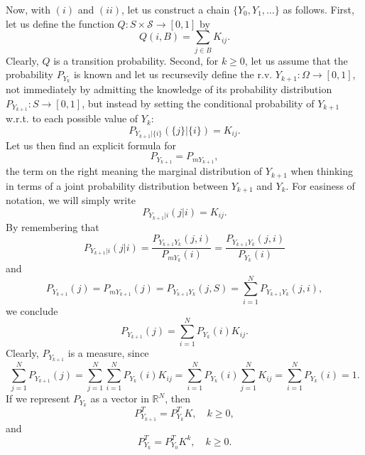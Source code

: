 Now, with $(i)$ and $(ii)$, let us construct a chain $\{Y_0,Y_1,\ldots\}$ as follows.
First, let us define the function $Q:S\times\mathcal{S}\rightarrow [0,1]$ by
\begin{equation*}
Q(i,B) = \sum_{j\in B}{K}_{ij}.
\end{equation*}
Clearly, $Q$ is a transition probability.
Second, for $k\geqslant 0$, let us assume that the probability $P_{Y_{k}}$ is known and
let us recursevily define the r.v. $Y_{k+1}:\Omega\rightarrow [0,1]$,
not immediately
by admitting the knowledge of its probability distribution $P_{Y_{k+1}}:S\rightarrow [0,1]$,
but instead
by setting the conditional probability of $Y_{k+1}$ w.r.t. to each possible value of $Y_k$:
\begin{equation*}
P_{Y_{k+1}|\{i\}}(\{j\}|\{i\})={K}_{ij}.
\end{equation*}
Let us then find an explicit formula for
\begin{equation*}
P_{Y_{k+1}} = P_{mY_{k+1}},
\end{equation*}
the term on the right meaning the marginal distribution of $Y_{k+1}$ when thinking in terms of a joint probability distribution between $Y_{k+1}$ and $Y_k$.
For easiness of notation, we will simply write
\begin{equation*}
P_{Y_{k+1}|i}(j|i)={K}_{ij}.
\end{equation*}
%
By remembering that
\begin{equation*}
P_{Y_{k+1}|i}(j|i) = \frac{P_{Y_{k+1}Y_k}(j,i)}{P_{mY_k}(i)} = \frac{P_{Y_{k+1}Y_k}(j,i)}{P_{Y_k}(i)}
\end{equation*}
and
\begin{equation*}
P_{Y_{k+1}}(j) = P_{mY_{k+1}}(j) = P_{Y_{k+1}Y_k}(j,S) = \sum_{i=1}^{N}P_{Y_{k+1}Y_k}(j,i),
\end{equation*}
we conclude
\begin{equation*}
P_{Y_{k+1}}(j) = \sum_{i=1}^{N}P_{Y_k}(i){K}_{ij}.
\end{equation*}
Clearly, $P_{Y_{k+1}}$ is a measure, since
\begin{equation*}
\sum_{j=1}^{N}P_{Y_{k+1}}(j) = \sum_{j=1}^{N}\sum_{i=1}^{N}P_{Y_k}(i){K}_{ij} = \sum_{i=1}^{N}P_{Y_k}(i)\sum_{j=1}^{N}{K}_{ij} = \sum_{i=1}^{N}P_{Y_k}(i) = 1.
\end{equation*}
If we represent $P_{Y_k}$ as a vector in $\mathbb{R}^N$, then
\begin{equation}\label{eq-markov-recursive-relation-finite}
P_{Y_{k+1}}^T = P_{Y_k}^TK,\quad k\geqslant 0,
\end{equation}
and
\begin{equation}\label{eq-markov-Kk}
P_{Y_k}^T = P_{Y_0}^T{K}^k,\quad k\geqslant 0.
\end{equation}

